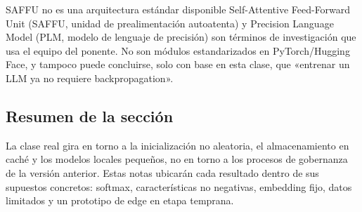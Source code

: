 \begin{warningbox}{SAFFU no es una arquitectura estándar disponible}
Self-Attentive Feed-Forward Unit (SAFFU, unidad de prealimentación autoatenta) y Precision Language Model (PLM, modelo de lenguaje de precisión) son términos de investigación que usa el equipo del ponente. No son módulos estandarizados en PyTorch/Hugging Face, y tampoco puede concluirse, solo con base en esta clase, que «entrenar un LLM ya no requiere backpropagation».
\end{warningbox}

\subsection{Resumen de la sección}

La clase real gira en torno a la inicialización no aleatoria, el almacenamiento en caché y los modelos locales pequeños, no en torno a los procesos de gobernanza de la versión anterior. Estas notas ubicarán cada resultado dentro de sus supuestos concretos: softmax, características no negativas, embedding fijo, datos limitados y un prototipo de edge en etapa temprana.
